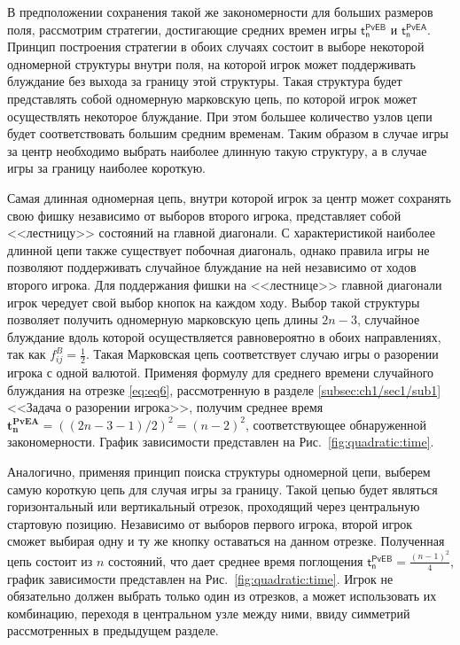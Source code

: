 В предположении сохранения такой же закономерности для больших размеров поля, рассмотрим стратегии, достигающие средних времен игры $\boldsymbol{\mathsf{t_n^{PvE B}}}$ и $\boldsymbol{\mathsf{t_n^{PvE A}}}$. Принцип построения стратегии в обоих случаях состоит в выборе некоторой одномерной структуры внутри поля, на которой игрок может поддерживать блуждание без выхода за границу этой структуры. Такая структура будет представлять собой одномерную марковскую цепь, по которой игрок может осуществлять некоторое блуждание. При этом большее количество узлов цепи будет соответствовать большим средним временам. Таким образом в случае игры за центр необходимо выбрать наиболее длинную такую структуру, а в случае игры за границу наиболее короткую.

Самая длинная одномерная цепь, внутри которой игрок за центр может сохранять свою фишку независимо от выборов второго игрока, представляет собой <<лестницу>> состояний на главной диагонали. С характеристикой наиболее длинной цепи также существует побочная диагональ, однако правила игры не позволяют поддерживать случайное блуждание на ней независимо от ходов второго игрока. Для поддержания фишки на <<лестнице>> главной диагонали игрок чередует свой выбор кнопок на каждом ходу. Выбор такой структуры позволяет получить одномерную марковскую цепь длины $2n-3$, случайное блуждание вдоль которой осуществляется равновероятно в обоих направлениях, так как $f_{ij}^B=\frac{1}{2}$. Такая Марковская цепь соответствует случаю игры о разорении игрока с одной валютой. Применяя формулу для среднего времени случайного блуждания на отрезке \eqref{eq:eq6}, рассмотренную в разделе \cref{subsec:ch1/sec1/sub1} <<Задача о разорении игрока>>, получим среднее время $\boldsymbol{t_n^{PvE A}} = ((2n-3-1)/2)^2 = (n-2)^2$, соответствующее обнаруженной закономерности. График зависимости представлен на Рис.~\cref{fig:quadratic:time}.

Аналогично, применяя принцип поиска структуры одномерной цепи, выберем самую короткую цепь для случая игры за границу. Такой цепью будет являться горизонтальный или вертикальный отрезок, проходящий через центральную стартовую позицию. Независимо от выборов первого игрока, второй игрок сможет выбирая одну и ту же кнопку оставаться на данном отрезке. Полученная цепь состоит из $n$ состояний, что дает среднее время поглощения $\boldsymbol{\mathsf{t_n^{PvE B}}} = \frac{(n-1)^2}{4}$, график зависимости представлен на Рис.~\cref{fig:quadratic:time}. Игрок не обязательно должен выбрать только один из отрезков, а может использовать их комбинацию, переходя в центральном узле между ними, ввиду симметрий рассмотренных в предыдущем разделе. 

